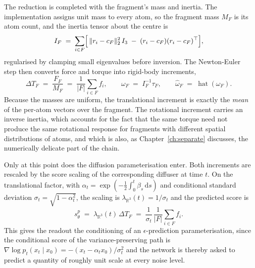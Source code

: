 \documentclass[11pt,a4paper]{report}
\theoremstyle{plain}
\theoremstyle{definition}
\theoremstyle{remark}
\newcommand{\R}{\mathbb{R}}
\newcommand{\dif}{\mathrm{d}}
\newcommand{\skewm}[1]{\widehat{#1}}
\begin{document}
The reduction is completed with the fragment's mass and inertia. The
implementation assigns unit mass to every atom, so the fragment mass $M_F$ is
its atom count, and the inertia tensor about the centre is
\begin{equation}
  I_F \;=\; \sum_{i \in F}
  \Bigl[\, \|r_i - c_F\|_2^{2}\, I_3 \;-\; (r_i - c_F)(r_i - c_F)^{\top} \Bigr],
  \label{eq:inertia}
\end{equation}
regularised by clamping small eigenvalues before inversion. The Newton-Euler
step then converts force and torque into rigid-body increments,
\begin{equation}
  \Delta T_F \;=\; \frac{F_F}{M_F} \;=\; \frac{1}{|F|}\sum_{i\in F} f_i,
  \qquad
  \omega_F \;=\; I_F^{-1}\tau_F ,
  \qquad
  \skewm{\omega}_F \;=\; \operatorname{hat}(\omega_F).
  \label{eq:updates}
\end{equation}
Because the masses are uniform, the translational increment is exactly the
\emph{mean} of the per-atom vectors over the fragment. The rotational
increment carries an inverse inertia, which accounts for the fact that the
same torque need not produce the same rotational response for fragments with
different spatial distributions of atoms, and which is also, as
Chapter~\ref{ch:separate} discusses, the numerically delicate part of the
chain.

Only at this point does the diffusion parameterisation enter. Both increments
are rescaled by the score scaling of the corresponding diffuser at time $t$.
On the translational factor, with $\alpha_t = \exp(-\tfrac12\int_0^t \beta_s\,\dif s)$
and conditional standard deviation $\sigma_t = \sqrt{1-\alpha_t^{2}}$, the
scaling is $\lambda_{\R^3}(t) = 1/\sigma_t$ and the predicted score is
\begin{equation}
  s^{p}_\theta \;=\; \lambda_{\R^3}(t)\, \Delta T_F
  \;=\; \frac{1}{\sigma_t}\,\frac{1}{|F|}\sum_{i\in F} f_i .
  \label{eq:trans-score}
\end{equation}
This gives the readout the conditioning of an $\epsilon$-prediction
parameterisation, since the conditional score of the variance-preserving path
is $\nabla \log p_t(x_t\mid x_0) = -(x_t - \alpha_t x_0)/\sigma_t^{2}$ and the
network is thereby asked to predict a quantity of roughly unit scale at every
noise level.
\end{document}
